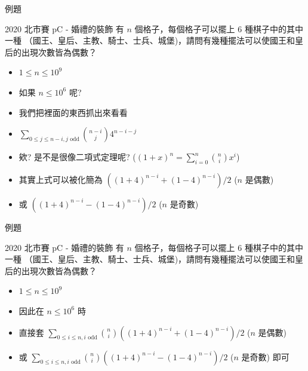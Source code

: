 \documentclass[aspectratio=169]{beamer}
\begin{document}
    \begin{frame}{例題}
        \begin{block}{2020 北市賽 pC - 婚禮的裝飾}
            有 $n$ 個格子，每個格子可以擺上 $6$ 種棋子中的其中一種 （國王、皇后、主教、騎士、士兵、城堡)，請問有幾種擺法可以使國王和皇后的出現次數皆為偶數？
            \begin{itemize}
                \item $1 \le n \le 10^9$
            \end{itemize}
        \end{block}
        \begin{itemize}
            \item<1-> 如果 $n \le 10^6$ 呢?
            \item<2-> 我們把裡面的東西抓出來看看
            \item<2-> $\displaystyle \sum_{0 \le j \le n-i, j \text{ odd}} \binom{n-i}{j} 4^{n-i-j}$
            \item<3-> 欸? 是不是很像二項式定理呢? ($(1+x)^n = \sum_{i=0}^n \binom{n}{i} x^i$)
            \item<4-> 其實上式可以被化簡為 $((1+4)^{n-i} + (1-4)^{n-i})/2$ ($n$ 是偶數) 
            \item<4-> 或 $((1+4)^{n-i} - (1-4)^{n-i})/2$ ($n$ 是奇數)
        \end{itemize}
    \end{frame}
    
    \begin{frame}{例題}
        \begin{block}{2020 北市賽 pC - 婚禮的裝飾}
            有 $n$ 個格子，每個格子可以擺上 $6$ 種棋子中的其中一種 （國王、皇后、主教、騎士、士兵、城堡)，請問有幾種擺法可以使國王和皇后的出現次數皆為偶數？
            \begin{itemize}
                \item $1 \le n \le 10^9$
            \end{itemize}
        \end{block}
        \begin{itemize}
            \item 因此在 $n \le 10^6$ 時
            \item 直接套 $\displaystyle \sum_{0 \le i \le n, i \text{ odd}} \binom{n}{i} ((1+4)^{n-i} + (1-4)^{n-i})/2$ ($n$ 是偶數) 
            \item 或 $\displaystyle \sum_{0 \le i \le n, i \text{ odd}} \binom{n}{i} ((1+4)^{n-i} - (1-4)^{n-i})/2$ ($n$ 是奇數) 即可
        \end{itemize}
    \end{frame}
    
\end{document}
